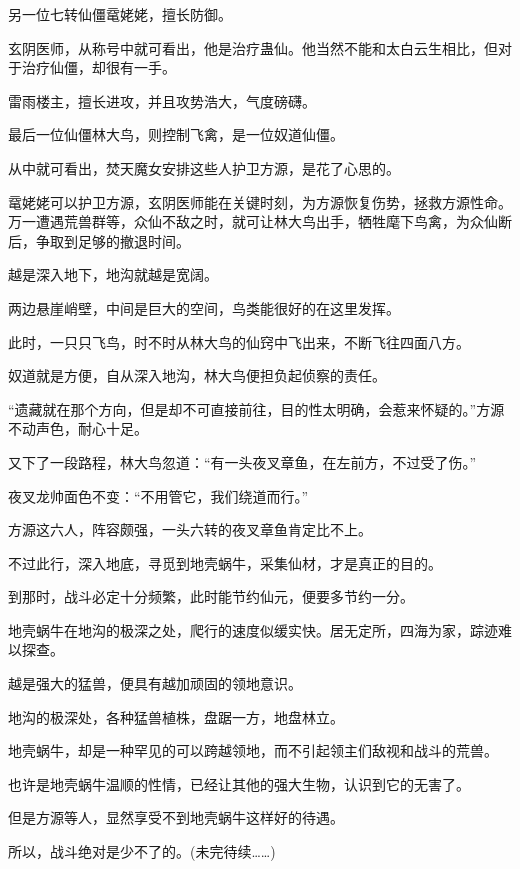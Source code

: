 \begin{this_body}
另一位七转仙僵鼋姥姥，擅长防御。

玄阴医师，从称号中就可看出，他是治疗蛊仙。他当然不能和太白云生相比，但对于治疗仙僵，却很有一手。

雷雨楼主，擅长进攻，并且攻势浩大，气度磅礴。

最后一位仙僵林大鸟，则控制飞禽，是一位奴道仙僵。

从中就可看出，焚天魔女安排这些人护卫方源，是花了心思的。

鼋姥姥可以护卫方源，玄阴医师能在关键时刻，为方源恢复伤势，拯救方源性命。万一遭遇荒兽群等，众仙不敌之时，就可让林大鸟出手，牺牲麾下鸟禽，为众仙断后，争取到足够的撤退时间。

越是深入地下，地沟就越是宽阔。

两边悬崖峭壁，中间是巨大的空间，鸟类能很好的在这里发挥。

此时，一只只飞鸟，时不时从林大鸟的仙窍中飞出来，不断飞往四面八方。

奴道就是方便，自从深入地沟，林大鸟便担负起侦察的责任。

“遗藏就在那个方向，但是却不可直接前往，目的性太明确，会惹来怀疑的。”方源不动声色，耐心十足。

又下了一段路程，林大鸟忽道：“有一头夜叉章鱼，在左前方，不过受了伤。”

夜叉龙帅面色不变：“不用管它，我们绕道而行。”

方源这六人，阵容颇强，一头六转的夜叉章鱼肯定比不上。

不过此行，深入地底，寻觅到地壳蜗牛，采集仙材，才是真正的目的。

到那时，战斗必定十分频繁，此时能节约仙元，便要多节约一分。

地壳蜗牛在地沟的极深之处，爬行的速度似缓实快。居无定所，四海为家，踪迹难以探查。

越是强大的猛兽，便具有越加顽固的领地意识。

地沟的极深处，各种猛兽植株，盘踞一方，地盘林立。

地壳蜗牛，却是一种罕见的可以跨越领地，而不引起领主们敌视和战斗的荒兽。

也许是地壳蜗牛温顺的性情，已经让其他的强大生物，认识到它的无害了。

但是方源等人，显然享受不到地壳蜗牛这样好的待遇。

所以，战斗绝对是少不了的。(未完待续……)

\end{this_body}

